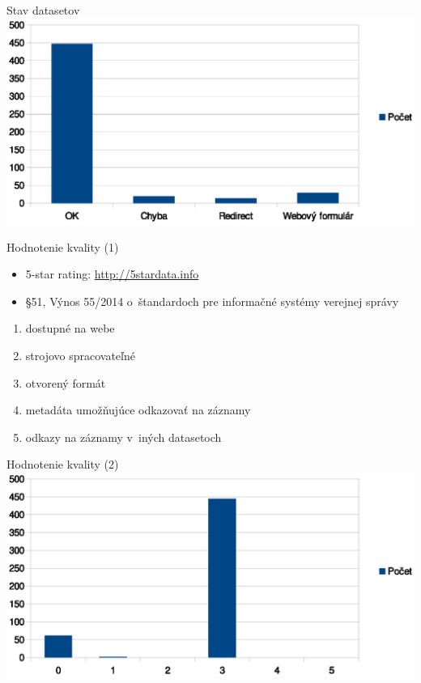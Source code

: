 \documentclass[slovak,14pt,utf8]{beamer}
\begin{document}
\begin{frame}{Stav datasetov}
    \includegraphics[width=\linewidth]{status}
\end{frame}

\begin{frame}{Hodnotenie kvality (1)}
    \begin{itemize}
        \item 5-star rating: \url{http://5stardata.info}
        \item §51, Výnos 55/2014 o~štandardoch pre informačné systémy verejnej správy
    \end{itemize}
    \begin{enumerate}
        \item dostupné na webe
        \item strojovo spracovateľné
        \item otvorený formát
        \item metadáta umožňujúce odkazovať na záznamy
        \item odkazy na záznamy v~iných datasetoch
    \end{enumerate}
\end{frame}

\begin{frame}{Hodnotenie kvality (2)}
    \includegraphics[width=\linewidth]{stars}
\end{frame}
\end{document}
